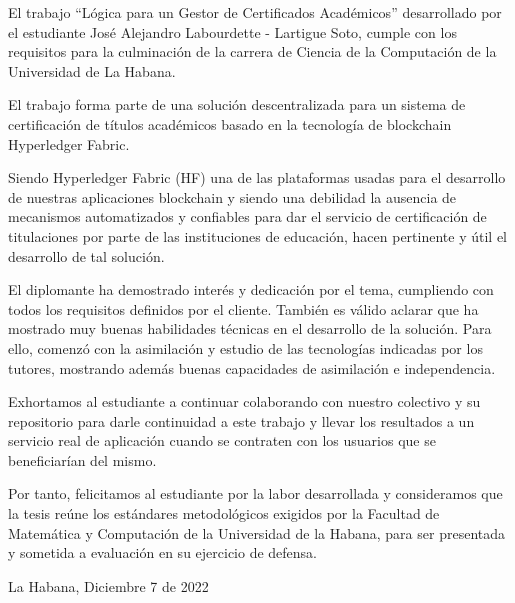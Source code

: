 \begin{opinion}
El trabajo ``Lógica para un Gestor de Certificados Académicos'' desarrollado por el estudiante José Alejandro Labourdette - Lartigue Soto, cumple con los requisitos para la culminación de la carrera de Ciencia de la Computación de la Universidad de La Habana.

El trabajo forma parte de una solución descentralizada para un sistema de certificación de títulos académicos basado en la tecnología de blockchain Hyperledger Fabric.

Siendo Hyperledger Fabric (HF) una de las plataformas usadas para el desarrollo de nuestras aplicaciones blockchain y siendo una debilidad la ausencia de mecanismos automatizados y confiables para dar el servicio de certificación de titulaciones por parte de las instituciones de educación, hacen pertinente y útil el desarrollo de tal solución.

El diplomante ha demostrado interés y dedicación por el tema, cumpliendo con todos los requisitos definidos por el cliente. También es válido aclarar que ha mostrado muy buenas habilidades técnicas en el desarrollo de la solución. Para ello, comenzó con la asimilación y estudio de las tecnologías indicadas por los tutores, mostrando además buenas capacidades de asimilación e independencia.

Exhortamos al estudiante a continuar colaborando con nuestro colectivo y su repositorio para darle continuidad a este trabajo y llevar los resultados a un servicio real de aplicación cuando se contraten con los usuarios que se beneficiarían del mismo.

Por tanto, felicitamos al estudiante por la labor desarrollada y consideramos que la tesis reúne los estándares metodológicos exigidos por la Facultad de Matemática y Computación de la Universidad de la Habana, para ser presentada y sometida a evaluación en su ejercicio de defensa.

\:

La Habana, Diciembre 7 de 2022

\begingroup
{}
\hspace{0.1cm}
\hspace{0.1cm}
\par
\endgroup
    
\end{opinion}